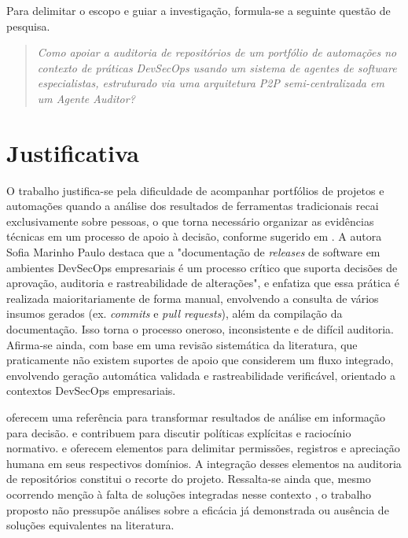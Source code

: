 Para delimitar o escopo e guiar a investigação, formula-se a seguinte questão de pesquisa.

\begin{quote}
\textit{Como apoiar a auditoria de repositórios de um portfólio de automações no contexto de práticas DevSecOps usando um sistema de agentes de software especialistas, estruturado via uma arquitetura P2P semi-centralizada em um Agente Auditor?}
\end{quote}


\section{Justificativa}
\label{1-justificativa}

O trabalho justifica-se pela dificuldade de acompanhar portfólios de projetos e automações quando a análise dos resultados de ferramentas tradicionais recai exclusivamente sobre pessoas, o que torna necessário organizar as evidências técnicas em um processo de apoio à decisão, conforme sugerido em . A autora Sofia Marinho Paulo destaca que a "documentação de \textit{releases} de software em ambientes DevSecOps empresariais é um processo crítico que suporta decisões de aprovação, auditoria e rastreabilidade de alterações", e enfatiza que essa prática é realizada maioritariamente de forma manual, envolvendo a consulta de vários insumos gerados (ex. \textit{commits} e \textit{pull requests}), além da compilação da documentação. Isso torna o processo oneroso, inconsistente e de difícil auditoria. Afirma-se ainda, com base em uma revisão sistemática da literatura, que praticamente não existem suportes de apoio que considerem um fluxo integrado, envolvendo geração automática validada e rastreabilidade verificável, orientado a contextos DevSecOps empresariais. 

 oferecem uma referência para transformar resultados de análise em informação para decisão.  e  contribuem para discutir políticas explícitas e raciocínio normativo.  e  oferecem elementos para delimitar permissões, registros e apreciação humana em seus respectivos domínios. A integração desses elementos na auditoria de repositórios constitui o recorte do projeto. Ressalta-se ainda que, mesmo ocorrendo menção à falta de soluções integradas nesse contexto , o trabalho proposto não pressupõe análises sobre a eficácia já demonstrada ou ausência de soluções equivalentes na literatura.

